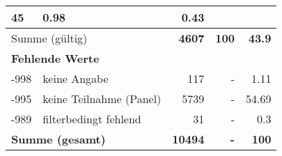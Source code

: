 \begin{longtable}{lXrrr}
       \num{45} &
       \num[round-mode=places,round-precision=2]{0,98} &
         \num[round-mode=places,round-precision=2]{0,43} \\
     \midrule
     \multicolumn{2}{l}{Summe (gültig)} &
       \textbf{\num{4607}} &
     \textbf{100} &
       \textbf{\num[round-mode=places,round-precision=2]{43,9}} \\
     \multicolumn{5}{l}{\textbf{Fehlende Werte}}\\
       -998 &
       keine Angabe &
         \num{117} &
        - &
         \num[round-mode=places,round-precision=2]{1,11} \\
       -995 &
       keine Teilnahme (Panel) &
         \num{5739} &
        - &
         \num[round-mode=places,round-precision=2]{54,69} \\
       -989 &
       filterbedingt fehlend &
         \num{31} &
        - &
         \num[round-mode=places,round-precision=2]{0,3} \\
     \midrule
     \multicolumn{2}{l}{\textbf{Summe (gesamt)}} &
          \textbf{\num{10494}} &
        \textbf{-} &
        \textbf{100} \\
     \bottomrule
     \end{longtable}
     
